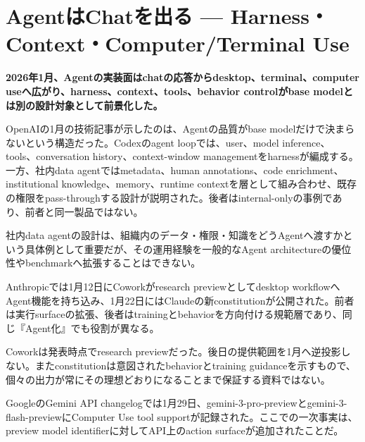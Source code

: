 \section{AgentはChatを出る — Harness・Context・Computer/Terminal Use}
\label{pkg:agent-stack-leaves-chat}
\noindent\textbf{2026年1月、Agentの実装面はchatの応答からdesktop、terminal、computer useへ広がり、harness、context、tools、behavior controlがbase modelとは別の設計対象として前景化した。}\autocite{src-a24fd97eb3d0,src-ae10eb4597fe,src-d8b7c1c36830,src-f6aa679babd7}

OpenAIの1月の技術記事が示したのは、Agentの品質がbase modelだけで決まらないという構造だった。Codexのagent loopでは、user、model inference、tools、conversation history、context-window managementをharnessが編成する。一方、社内data agentではmetadata、human annotations、code enrichment、institutional knowledge、memory、runtime contextを層として組み合わせ、既存の権限をpass-throughする設計が説明された。後者はinternal-onlyの事例であり、前者と同一製品ではない。\autocite{src-ae10eb4597fe,src-fa5410010e0a}


\begin{claimboundary}
社内data agentの設計は、組織内のデータ・権限・知識をどうAgentへ渡すかという具体例として重要だが、その運用経験を一般的なAgent architectureの優位性やbenchmarkへ拡張することはできない。\autocite{src-ae10eb4597fe,src-fa5410010e0a}
\end{claimboundary}

Anthropicでは1月12日にCoworkがresearch previewとしてdesktop workflowへAgent機能を持ち込み、1月22日にはClaudeの新constitutionが公開された。前者は実行surfaceの拡張、後者はtrainingとbehaviorを方向付ける規範層であり、同じ『Agent化』でも役割が異なる。\autocite{src-f6aa679babd7}


\begin{claimboundary}
Coworkは発表時点でresearch previewだった。後日の提供範囲を1月へ逆投影しない。またconstitutionは意図されたbehaviorとtraining guidanceを示すもので、個々の出力が常にその理想どおりになることまで保証する資料ではない。\autocite{src-f6aa679babd7}
\end{claimboundary}

GoogleのGemini API changelogでは1月29日、gemini-3-pro-previewとgemini-3-flash-previewにComputer Use tool supportが記録された。ここでの一次事実は、preview model identifierに対してAPI上のaction surfaceが追加されたことだ。\autocite{src-a24fd97eb3d0}


